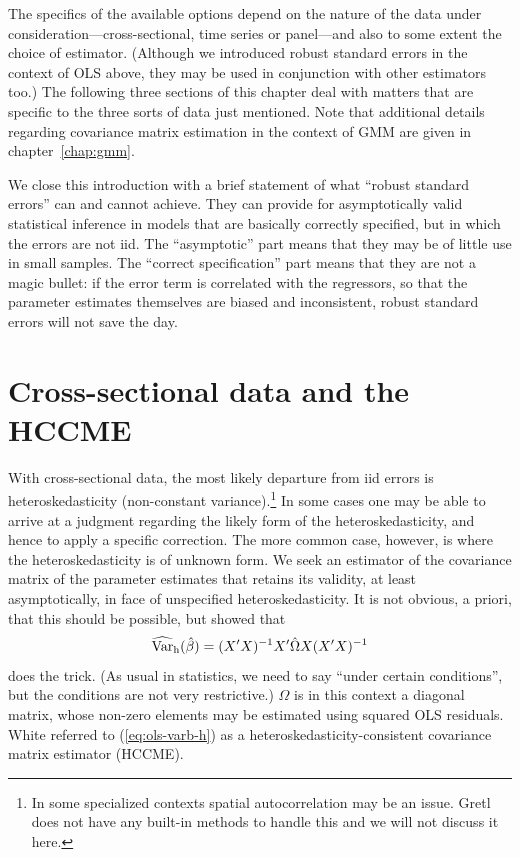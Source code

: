 The specifics of the available options depend on the nature of the
data under consideration---cross-sectional, time series or panel---and
also to some extent the choice of estimator.  (Although we introduced
robust standard errors in the context of OLS above, they may be used
in conjunction with other estimators too.)  The following three
sections of this chapter deal with matters that are specific to the
three sorts of data just mentioned.  Note that additional details
regarding covariance matrix estimation in the context of GMM are given
in chapter~\ref{chap:gmm}.

We close this introduction with a brief statement of what ``robust
standard errors'' can and cannot achieve.  They can provide for
asymptotically valid statistical inference in models that are
basically correctly specified, but in which the errors are not iid.
The ``asymptotic'' part means that they may be of little use in small
samples.  The ``correct specification'' part means that they are not a
magic bullet: if the error term is correlated with the regressors, so
that the parameter estimates themselves are biased and inconsistent,
robust standard errors will not save the day.


\section{Cross-sectional data and the HCCME}
\label{vcv-hccme}

With cross-sectional data, the most likely departure from iid errors
is heteroskedasticity (non-constant variance).\footnote{In some
  specialized contexts spatial autocorrelation may be an issue.  Gretl
  does not have any built-in methods to handle this and we will not
  discuss it here.}  In some cases one may be able to arrive at a
judgment regarding the likely form of the heteroskedasticity, and
hence to apply a specific correction.  The more common case, however,
is where the heteroskedasticity is of unknown form.  We seek an
estimator of the covariance matrix of the parameter estimates that
retains its validity, at least asymptotically, in face of unspecified
heteroskedasticity.  It is not obvious, a priori, that this should be
possible, but \cite{white80} showed that
%
\begin{equation}
\label{eq:ols-varb-h}
\widehat{\mbox{Var}}_{\rm h}(\hat{\beta}) = 
       (X'X)^{-1} X' \hat{\Omega} X (X'X)^{-1}
\end{equation}
%
does the trick. (As usual in statistics, we need to say ``under
certain conditions'', but the conditions are not very restrictive.)
$\hat{\Omega}$ is in this context a diagonal matrix, whose non-zero
elements may be estimated using squared OLS residuals.  White referred
to (\ref{eq:ols-varb-h}) as a heteroskedasticity-consistent covariance
matrix estimator (HCCME).

